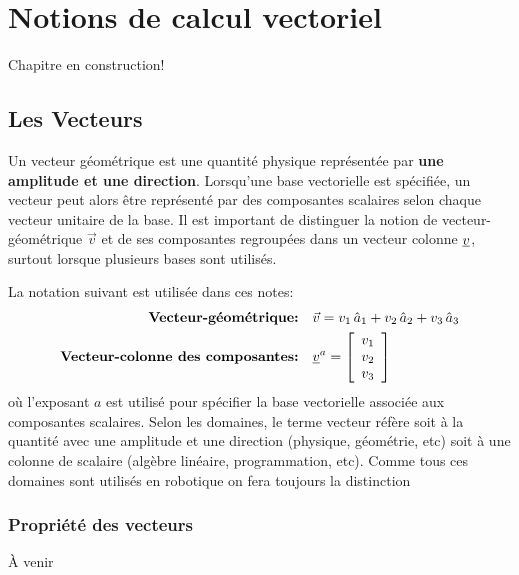 \chapter{Notions de calcul vectoriel}


Chapitre en construction!

\section{Les Vecteurs}
\label{sec:veccomrep}

Un vecteur géométrique est une quantité physique représentée par \textbf{une amplitude et une direction}. Lorsqu'une base vectorielle est spécifiée, un vecteur peut alors être représenté par des composantes scalaires selon chaque vecteur unitaire de la base. Il est important de distinguer la notion de vecteur-géométrique $\vec{v}$ et de ses composantes regroupées dans un vecteur colonne $\underline{v}$, surtout lorsque plusieurs bases sont utilisés. 

La notation suivant est utilisée dans ces notes:
\begin{align}
\text{\textbf{Vecteur-géométrique:}}&\quad
\vec{v} = v_1 \, \hat{a}_{1} + v_2 \, \hat{a}_{2} + v_3 \, \hat{a}_{3}
\\
\text{\textbf{Vecteur-colonne des composantes:}}&\quad
\underline{v}^{a} = \left[ \begin{array}{c} v_1 \\ v_2 \\ v_3  \end{array} \right] 
\label{eq:veccoldef2}
\end{align} 
où l'exposant $a$ est utilisé pour spécifier la base vectorielle associée aux composantes scalaires. Selon les domaines, le terme vecteur réfère soit à la quantité avec une amplitude et une direction (physique, géométrie, etc) soit à une colonne de scalaire (algèbre linéaire, programmation, etc). Comme tous ces domaines sont utilisés en robotique on fera toujours la distinction 


\subsection{Propriété des vecteurs}

À venir

